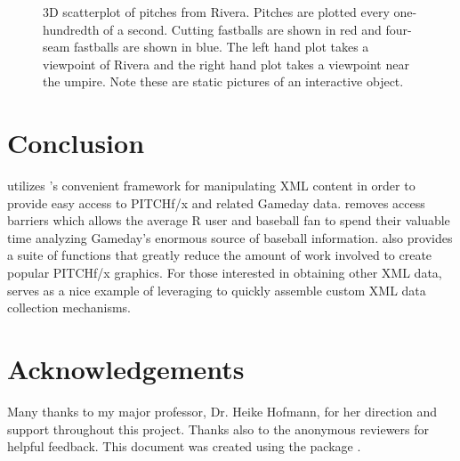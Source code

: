 \begin{article}
\begin{figure}[h]
\caption{3D scatterplot of pitches from Rivera. Pitches are plotted every one-hundredth
of a second. Cutting fastballs are shown in red and four-seam fastballs
are shown in blue. The left hand plot takes a viewpoint of Rivera
and the right hand plot takes a viewpoint near the umpire. Note these
are static pictures of an interactive object. \label{fig:rgl}}
\end{figure}



\section{Conclusion}
 utilizes 's convenient framework for manipulating
XML content in order to provide easy access to PITCHf/x and related
Gameday data.  removes access barriers which allows
the average R user and baseball fan to spend their valuable time analyzing
Gameday's enormous source of baseball information. 
also provides a suite of functions that greatly reduce the amount
of work involved to create popular PITCHf/x graphics. For those interested
in obtaining other XML data,  serves as a nice example
of leveraging  to quickly assemble custom XML data collection
mechanisms.

\section{Acknowledgements}

Many thanks to my major professor, Dr. Heike Hofmann, for her direction
and support throughout this project. Thanks also to the anonymous
reviewers for helpful feedback. This document was created using the
 package \citet{knitr}.






\address{Carson Sievert\\
Department of Statistics\\
Iowa State University}\\

\end{article}
